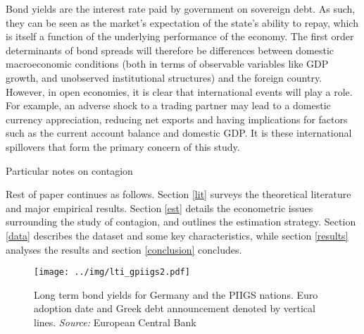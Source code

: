 \documentclass[/../base.tex]{subfiles}
\begin{document}
Bond yields are the interest rate paid by government on sovereign debt. As such, they can be seen as the market's expectation of the state's ability to repay, which is itself a function of the underlying performance of the economy. The first order determinants of bond spreads will therefore be differences between domestic macroeconomic conditions (both in terms of observable variables like GDP growth, and unobserved institutional structures) and the foreign country. However, in open economies, it is clear that international events will play a role. For example, an adverse shock to a trading partner may lead to a domestic currency appreciation, reducing net exports and having implications for factors such as the current account balance and domestic GDP. It is these international spillovers that form the primary concern of this study. 

Particular notes on contagion

Rest of paper continues as follows. Section \ref{lit} surveys the theoretical literature and major empirical results. Section \ref{est} details the econometric issues surrounding the study of contagion, and outlines the estimation strategy. Section \ref{data} describes the dataset and some key characteristics, while section \ref{results} analyses the results and section \ref{conclusion} concludes.


\begin{figure}
	\centering
	\texttt{[image: ../img/lti\_gpiigs2.pdf]}
	\caption{Long term bond yields for Germany and the PIIGS nations. Euro adoption date and Greek debt announcement denoted by vertical lines. \textit{Source:} European Central Bank}
	\label{fig:lit_gpiigs}
\end{figure}
\end{document}
